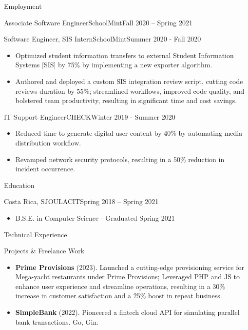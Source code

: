 \documentclass[]{mcdowellcv}
\begin{document}
\begin{cvsection}{Employment}
\begin{cvsubsection}{Associate Software Engineer}{SchoolMint}{Fall 2020 -- Spring 2021}
\begin{itemize}
			\end{itemize}
		\end{cvsubsection}
		\begin{cvsubsection}{Software Engineer, SIS Intern}{SchoolMint}{Summer 2020 - Fall 2020}
			\begin{itemize}
				\item Optimized student information transfers to external Student Information Systems [SIS] by 75\% by implementing a new exporter algorithm.
				\item Authored and deployed a custom SIS integration review script, cutting code reviews duration by 55\%; streamlined workflows, improved code quality, and bolstered team productivity, resulting in significant time and cost savings.
			\end{itemize}
		\end{cvsubsection}
		\begin{cvsubsection}{IT Support Engineer}{CHECK}{Winter 2019 - Summer 2020}
			\begin{itemize}
				\item Reduced time to generate digital user content by 40\% by automating media distribution workflow.
				\item Revamped network security protocols, resulting in a 50\% reduction in incident occurrence.
			\end{itemize}
		\end{cvsubsection}
	\end{cvsection}
	\begin{cvsection}{Education}
		\begin{cvsubsection}{Costa Rica, SJO}{ULACIT}{Spring 2018 -- Spring 2021}
			\begin{itemize}
				\item B.S.E. in Computer Science - Graduated Spring 2021
			\end{itemize}
		\end{cvsubsection}
	\end{cvsection}
	\begin{cvsection}{Technical Experience}
		\begin{cvsubsection}{Projects \& Freelance Work}{}{}
			\begin{itemize}
				\item \textbf{Prime Provisions} (2023). Launched a cutting-edge provisioning service for Mega-yacht restaurants under Prime Provisions; Leveraged PHP and JS to enhance user experience and streamline operations, resulting in a 30\% increase in customer satisfaction and a 25\% boost in repeat business.
			\end{itemize}
			\begin{itemize}
				\item \textbf{SimpleBank} (2022). Pioneered a fintech cloud API for simulating parallel bank transactions. Go, Gin.
			\end{itemize}
		\end{cvsubsection}
	\end{cvsection}
\end{document}
